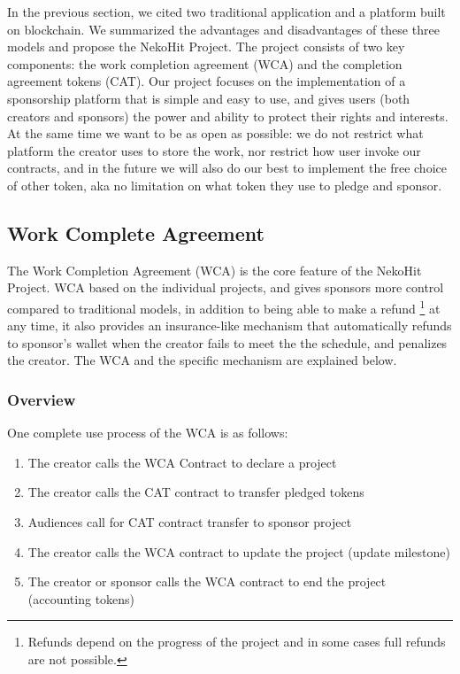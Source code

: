 \documentclass[12pt,a4paper]{article}
\begin{document}
    In the previous section, we cited two traditional application and a platform
    built on blockchain. We summarized the advantages and disadvantages of these
    three models and propose the NekoHit Project. The project consists of two
    key components: the work completion agreement (WCA) and the completion agreement
    tokens (CAT). Our project focuses on the implementation of a sponsorship
    platform that is simple and easy to use, and gives users (both creators
    and sponsors) the power and ability to protect their rights and
    interests. At the same time we want to be as open as possible: we do not
    restrict what platform the creator uses to store the work, nor restrict
    how user invoke our contracts, and in the future we will also do our best
    to implement the free choice of other token, aka no limitation on what token
    they use to pledge and sponsor.

    \subsection{Work Complete Agreement}\label{subsec:wca}

    The Work Completion Agreement (WCA) is the core feature of the
    NekoHit Project. WCA based on the individual projects, and
    gives sponsors more control compared to traditional models,
    in addition to being able to make a refund \footnote{
        Refunds depend on the progress of the project and
        in some cases full refunds are not possible.
    } at any time, it also provides an insurance-like mechanism
    that automatically refunds to sponsor's wallet when the creator fails
    to meet the the schedule, and penalizes the creator.
    The WCA and the specific mechanism are explained below.

    \subsubsection{Overview}

    One complete use process of the WCA is as follows:

    \begin{enumerate}
        \item The creator calls the WCA Contract to declare a project
        \item The creator calls the CAT contract to transfer pledged tokens
        \item Audiences call for CAT contract transfer to sponsor project\label{item:purchase_wca}
        \item The creator calls the WCA contract to update the project (update milestone)\label{item:update_milestone}
        \item The creator or sponsor calls the WCA contract to end the project (accounting tokens)\label{item:finish_project}
    \end{enumerate}
\end{document}
